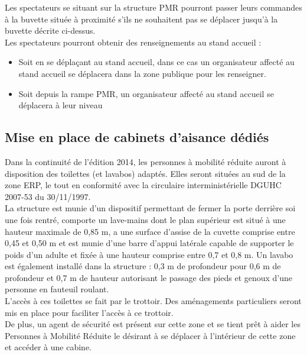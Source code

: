 \documentclass[hidelinks, paper=a4, fontsize=13pt]{report}
\begin{document}
Les spectateurs se situant sur la structure PMR pourront passer leurs commandes à la buvette située à proximité s’ils ne souhaitent pas se déplacer jusqu’à la buvette décrite ci-dessus. \\

Les spectateurs pourront obtenir des renseignements au stand accueil :
\begin{itemize}
\item Soit en se déplaçant au stand accueil, dans ce cas un organisateur affecté au stand accueil se déplacera dans la zone publique pour les renseigner.
\item Soit depuis la rampe PMR, un organisateur affecté au stand accueil se déplacera à leur niveau
\end{itemize}

\subsection{Mise en place de cabinets d’aisance dédiés}

Dans la continuité de l’édition 2014, les personnes à mobilité réduite auront à disposition des toilettes (et lavabos) adaptés. Elles seront situées au sud de la zone ERP, le tout en conformité avec la circulaire interministérielle DGUHC 2007-53 du 30/11/1997.\\

La structure est munie d’un dispositif permettant de fermer la porte derrière soi une fois rentré, comporte un lave-mains dont le plan supérieur est situé à une hauteur maximale de 0,85 m, a une surface d’assise de la cuvette comprise entre 0,45 et 0,50 m et est munie d’une barre d’appui latérale capable de supporter le poids d’un adulte et fixée à une hauteur comprise entre 0,7 et 0,8 m. Un lavabo est également installé dans la structure : 0,3 m de profondeur pour 0,6 m de profondeur et 0,7 m de hauteur autorisant le passage des pieds et genoux d’une personne en fauteuil roulant.\\

L’accès à ces toilettes se fait par le trottoir. Des aménagements particuliers seront mis en place pour faciliter l'accès à ce trottoir.\\

De plus, un agent de sécurité est présent sur cette zone et se tient prêt à aider les Personnes à Mobilité Réduite le désirant à se déplacer à l’intérieur de cette zone et accéder à une cabine.
\end{document}
